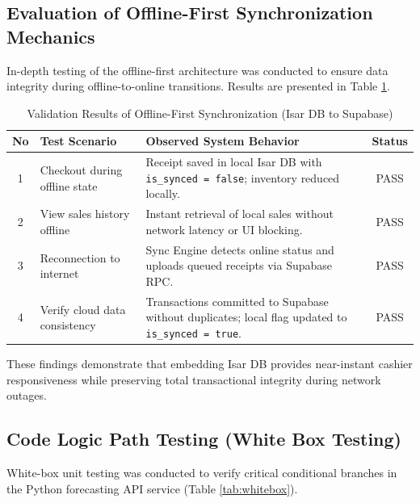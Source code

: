 \documentclass[10pt,a4paper]{article}
\begin{document}
\subsection{Evaluation of Offline-First Synchronization Mechanics}
In-depth testing of the offline-first architecture was conducted to ensure data integrity during offline-to-online transitions. Results are presented in Table \ref{tab:sinkronisasi}.

\begin{table}[htbp]
  \centering
  \caption{Validation Results of Offline-First Synchronization (Isar DB to Supabase)}
  \label{tab:sinkronisasi}
  \fontsize{8pt}{10.5pt}\selectfont
  \begin{tabularx}{\textwidth}{cp{4.5cm}Xc}
    \toprule
    \textbf{No} & \textbf{Test Scenario} & \textbf{Observed System Behavior} & \textbf{Status} \\
    \midrule
    1 & Checkout during offline state & Receipt saved in local Isar DB with \texttt{is\_synced = false}; inventory reduced locally. & PASS \\
    2 & View sales history offline    & Instant retrieval of local sales without network latency or UI blocking. & PASS \\
    3 & Reconnection to internet      & Sync Engine detects online status and uploads queued receipts via Supabase RPC. & PASS \\
    4 & Verify cloud data consistency & Transactions committed to Supabase without duplicates; local flag updated to \texttt{is\_synced = true}. & PASS \\
    \bottomrule
  \end{tabularx}
\end{table}

These findings demonstrate that embedding Isar DB provides near-instant cashier responsiveness while preserving total transactional integrity during network outages.

\subsection{Code Logic Path Testing (White Box Testing)}
White-box unit testing was conducted to verify critical conditional branches in the Python forecasting API service (Table \ref{tab:whitebox}).
\end{document}
